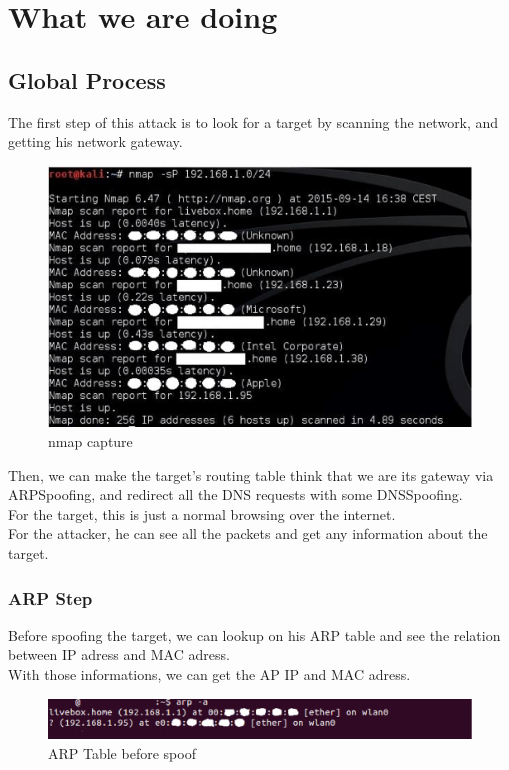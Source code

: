 \documentclass[a4paper, 11pt, oneside]{article}
\begin{document}
\pagebreak

\section{What we are doing}

\subsection{Global Process}
The first step of this attack is to look for a target by scanning the network, and getting his network gateway. \\
\begin{figure}[!h]
	\centering
	\includegraphics[scale=0.75]{../images/captureNMAP.eps}
	\caption{nmap capture} %
	\label{nmap_capture} %
\end{figure}
Then, we can make the target's routing table think that we are its gateway via ARPSpoofing, and redirect all the DNS requests with some DNSSpoofing.\\
For the target, this is just a normal browsing over the internet.\\
For the attacker, he can see all the packets and get any information about the target.\\

\subsubsection{ARP Step}
Before spoofing the target, we can lookup on his ARP table and see the relation between IP adress and MAC adress. \\
With those informations, we can get the AP IP and MAC adress. \\
\begin{figure}[!h]
	\centering
	\includegraphics[scale=0.75]{../images/arpTableBeforeSpoof.eps}
	\caption{ARP Table before spoof}
	\label{ARP_before_spoof}
\end{figure}
\end{document}
